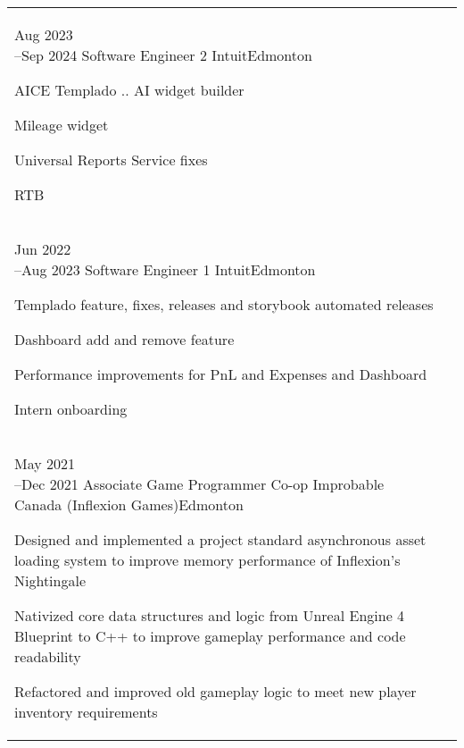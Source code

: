 
\section*{}

\begin{tabular}{@{\raggedright}p{} |>{\raggedright\arraybackslash}p{}}

    \cvevent{Aug 2023\newline --Sep 2024}
    {Software Engineer 2}
    {Intuit}{Edmonton}
    {\begin{tabitemize}
        \item AICE Templado .. AI widget builder
        \item Mileage widget
        \item Universal Reports Service fixes
        \item RTB
    \end{tabitemize}
    } \\

    \cvevent{Jun 2022\newline --Aug 2023}
    {Software Engineer 1}
    {Intuit}{Edmonton}
    {\begin{tabitemize}
        \item Templado feature, fixes, releases and storybook automated releases
        \item Dashboard add and remove feature
        \item Performance improvements for PnL and Expenses and Dashboard
        \item Intern onboarding
    \end{tabitemize}
    } \\

    \cvevent{May 2021\newline --Dec 2021}
    {Associate Game Programmer Co-op}
    {Improbable Canada (Inflexion Games)}{Edmonton}
    {\begin{tabitemize}
        \item Designed and implemented a project standard asynchronous asset loading system to improve memory performance of Inflexion's Nightingale
        \item Nativized core data structures and logic from Unreal Engine 4 Blueprint to C++ to improve gameplay performance and code readability
        \item Refactored and improved old gameplay logic to meet new player inventory requirements
    \end{tabitemize}
    } \\

\end{tabular}

